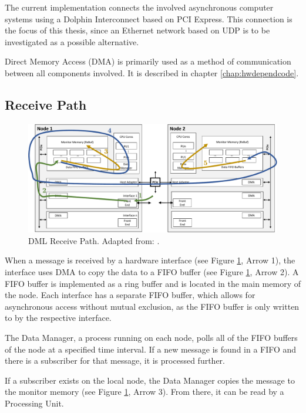 The current implementation connects the involved asynchronous computer systems using a Dolphin Interconnect based on PCI Express. This connection is the focus of this thesis, since an Ethernet network based on UDP is to be investigated as a possible alternative.

Direct Memory Access (DMA) is primarily used as a method of communication between all components involved. It is described in chapter \ref{chap:hwdependcode}.

\subsection{Receive Path}

\begin{figure}[h!]
    \centering
    \includegraphics[width=1\linewidth]{figures/dml/dml02.pdf}
    \caption[DML Receive Path]{DML Receive Path. Adapted from: \cite{dml01}.}
    \label{fig:DmlRec}
\end{figure}

When a message is received by a hardware interface (see Figure \ref{fig:DmlRec}, Arrow 1), the interface uses DMA to copy the data to a FIFO buffer (see Figure \ref{fig:DmlRec}, Arrow 2). A FIFO buffer is implemented as a ring buffer and is located in the main memory of the node. Each interface has a separate FIFO buffer, which allows for asynchronous access without mutual exclusion, as the FIFO buffer is only written to by the respective interface.

The Data Manager, a process running on each node, polls all of the FIFO buffers of the node at a specified time interval. If a new message is found in a FIFO and there is a subscriber for that message, it is processed further.

If a subscriber exists on the local node, the Data Manager copies the message to the monitor memory (see Figure \ref{fig:DmlRec}, Arrow 3). From there, it can be read by a Processing Unit.

